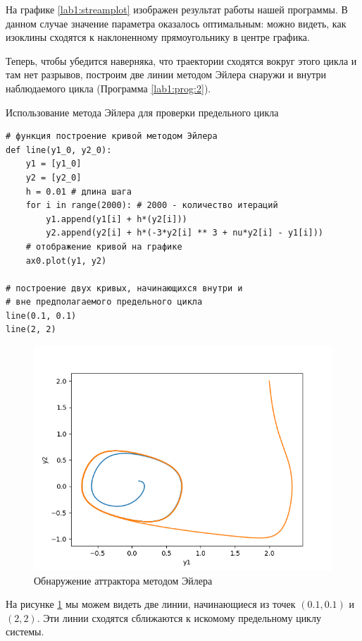 На графике \ref{lab1:streamplot} изображен результат работы нашей программы.
В данном случае значение параметра оказалось оптимальным: можно видеть, как
изоклины сходятся к наклоненному прямоугольнику в центре графика.

Теперь, чтобы убедится наверняка, что траектории сходятся вокруг этого цикла
и там нет разрывов, построим две линии методом Эйлера снаружи и внутри наблюдаемого
цикла (Программа \ref{lab1:prog:2}).

\begin{program}
  \caption{Использование метода Эйлера для проверки предельного цикла}
  \label{lab1:prog:2}
  \begin{verbatim}
# функция построение кривой методом Эйлера
def line(y1_0, y2_0):
    y1 = [y1_0]
    y2 = [y2_0]
    h = 0.01 # длина шага
    for i in range(2000): # 2000 - количество итераций
        y1.append(y1[i] + h*(y2[i]))
        y2.append(y2[i] + h*(-3*y2[i] ** 3 + nu*y2[i] - y1[i]))
    # отображение кривой на графике
    ax0.plot(y1, y2)

# построение двух кривых, начинающихся внутри и
# вне предполагаемого предельного цикла
line(0.1, 0.1)
line(2, 2)
  \end{verbatim}
\end{program}

\clearpage

\begin{figure}[thp]
  \centering
  \includegraphics[width=\textwidth]{figures/1_cycle}
  \caption{Обнаружение аттрактора методом Эйлера}
  \label{lab1:cycle}
\end{figure}

На рисунке \ref{lab1:cycle} мы можем видеть две линии, начинающиеся из точек
$(0.1, 0.1)$ и $(2, 2)$. Эти линии сходятся сближаются к искомому предельному
циклу системы.
